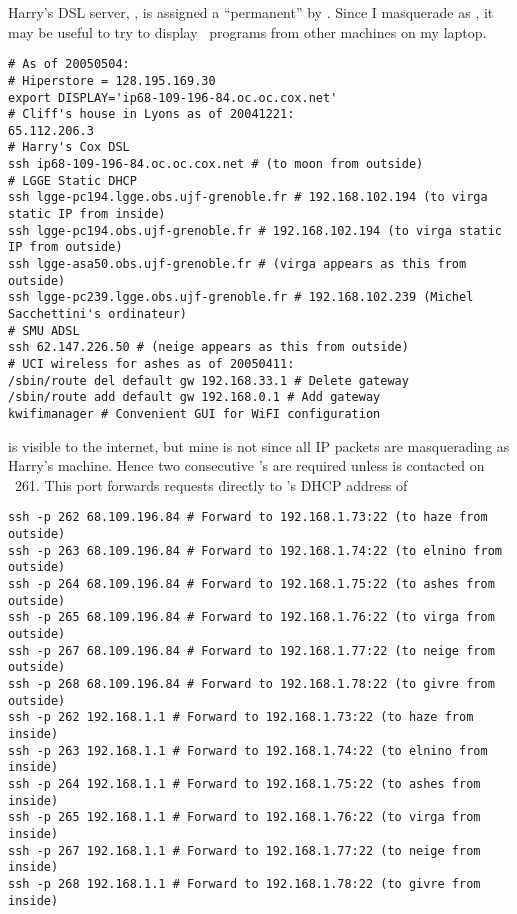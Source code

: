 \documentclass[12pt,twoside]{article}
\begin{document}
Harry's DSL server, , is assigned a ``permanent''
 by . 
Since I masquerade as , it may be useful to try
to display ~programs from other machines on my laptop.
\begin{verbatim}
# As of 20050504:
# Hiperstore = 128.195.169.30
export DISPLAY='ip68-109-196-84.oc.oc.cox.net'
# Cliff's house in Lyons as of 20041221:
65.112.206.3
# Harry's Cox DSL
ssh ip68-109-196-84.oc.oc.cox.net # (to moon from outside)
# LGGE Static DHCP
ssh lgge-pc194.lgge.obs.ujf-grenoble.fr # 192.168.102.194 (to virga static IP from inside)
ssh lgge-pc194.obs.ujf-grenoble.fr # 192.168.102.194 (to virga static IP from outside)
ssh lgge-asa50.obs.ujf-grenoble.fr # (virga appears as this from outside)
ssh lgge-pc239.lgge.obs.ujf-grenoble.fr # 192.168.102.239 (Michel Sacchettini's ordinateur)
# SMU ADSL
ssh 62.147.226.50 # (neige appears as this from outside)
# UCI wireless for ashes as of 20050411:
/sbin/route del default gw 192.168.33.1 # Delete gateway
/sbin/route add default gw 192.168.0.1 # Add gateway
kwifimanager # Convenient GUI for WiFI configuration
\end{verbatim}
 is visible to the internet, but mine is not since all
IP packets are masquerading as Harry's machine.
Hence two consecutive 's are required unless 
is contacted on ~261.
This port forwards  requests directly to 's
DHCP address of 
\begin{verbatim}
ssh -p 262 68.109.196.84 # Forward to 192.168.1.73:22 (to haze from outside)
ssh -p 263 68.109.196.84 # Forward to 192.168.1.74:22 (to elnino from outside)
ssh -p 264 68.109.196.84 # Forward to 192.168.1.75:22 (to ashes from outside)
ssh -p 265 68.109.196.84 # Forward to 192.168.1.76:22 (to virga from outside)
ssh -p 267 68.109.196.84 # Forward to 192.168.1.77:22 (to neige from outside)
ssh -p 268 68.109.196.84 # Forward to 192.168.1.78:22 (to givre from outside)
ssh -p 262 192.168.1.1 # Forward to 192.168.1.73:22 (to haze from inside)
ssh -p 263 192.168.1.1 # Forward to 192.168.1.74:22 (to elnino from inside)
ssh -p 264 192.168.1.1 # Forward to 192.168.1.75:22 (to ashes from inside)
ssh -p 265 192.168.1.1 # Forward to 192.168.1.76:22 (to virga from inside)
ssh -p 267 192.168.1.1 # Forward to 192.168.1.77:22 (to neige from inside)
ssh -p 268 192.168.1.1 # Forward to 192.168.1.78:22 (to givre from inside)
\end{verbatim}
\end{document}
